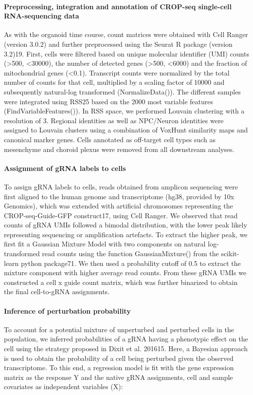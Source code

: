 \paragraph{Preprocessing, integration and annotation of CROP-seq single-cell RNA-sequencing data}
As with the organoid time course, count matrices were obtained with Cell Ranger (version 3.0.2) and further preprocessed using the Seurat R package (version 3.2)19. First, cells were filtered based on unique molecular identifier (UMI) counts (>500, <30000), the number of detected genes (>500, <6000) and the fraction of mitochondrial genes (<0.1). Transcript counts were normalized by the total number of counts for that cell, multiplied by a scaling factor of 10000 and subsequently natural-log transformed (NormalizeData()). The different samples were integrated using RSS25 based on the 2000 most variable features (FindVariableFeatures()). In RSS space, we performed Louvain clustering with a resolution of 3. Regional identities as well as NPC/Neuron identities were assigned to Louvain clusters using a combination of VoxHunt similarity maps and canonical marker genes. Cells annotated as off-target cell types such as mesenchyme and choroid plexus were removed from all downstream analyses.
 
\paragraph{Assignment of gRNA labels to cells}
To assign gRNA labels to cells, reads obtained from amplicon sequencing were first aligned to the human genome and transcriptome (hg38, provided by 10x Genomics), which was extended with artificial chromosomes representing the CROP-seq-Guide-GFP construct17, using Cell Ranger. We observed that read counts of gRNA UMIs followed a bimodal distribution, with the lower peak likely representing sequencing or amplification artefacts. To extract the higher peak, we first fit a Gaussian Mixture Model with two components on natural log-transformed read counts using the function GaussianMixture() from the scikit-learn python package71. We then used a probability cutoff of 0.5 to extract the mixture component with higher average read counts. From these gRNA UMIs we constructed a cell x guide count matrix, which was further binarized to obtain the final cell-to-gRNA assignments.
 
\paragraph{Inference of perturbation probability}
To account for a potential mixture of unperturbed and perturbed cells in the population, we inferred probabilities of a gRNA having a phenotypic effect on the cell using the strategy proposed in Dixit et al. 201615. Here, a Bayesian approach is used to obtain the probability of a cell being perturbed given the observed transcriptome. To this end, a regression model is fit with the gene expression matrix as the response Y and the native gRNA assignments, cell and sample covariates as independent variables (X):
 
